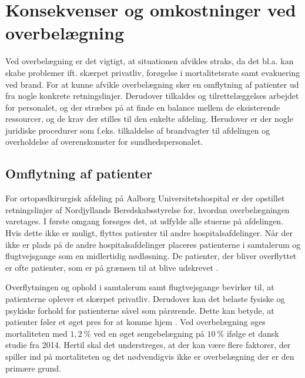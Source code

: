 \section{Konsekvenser og omkostninger ved overbelægning}
Ved overbelægning er det vigtigt, at situationen afvikles straks, da det bl.a. kan skabe problemer ift. skærpet privatliv, forøgelse i mortalitetsrate samt evakuering ved brand. \cite{Madsen2014} For at kunne afvikle overbelægning sker en omflytning af patienter ud fra nogle konkrete retningslinjer. \cite{Beredskab2016} Derudover tilkaldes og tilrettelæggelses arbejdet for personalet, og der stræbes på at finde en balance mellem de eksisterende ressourcer, og de krav der stilles til den enkelte afdeling. \cite{Bjerg2016} Herudover er der nogle juridiske procedurer som f.eks. tilkaldelse af brandvagter til afdelingen og overholdelse af overenskomster for sundhedspersonalet. \cite{Beredskab2016}


\subsection{Omflytning af patienter}
For ortopædkirurgisk afdeling på Aalborg Universitetshospital er der opstillet retningslinjer af Nordjyllands Beredskabsstyrelse for, hvordan overbelægningen varetages. I første omgang forsøges det, at udfylde alle stuerne på afdelingen. Hvis dette ikke er muligt, flyttes patienter til andre hospitalsafdelinger. Når der ikke er plads på de andre hospitalsafdelinger placeres patienterne i samtalerum og flugtvejsgange som en midlertidig nødløsning. \cite{Beredskab2016} De patienter, der bliver overflyttet er ofte patienter, som er på grænsen til at blive udskrevet .


\noindet
Overflytningen og ophold i samtalerum samt flugtvejsgange bevirker til, at patienterne oplever et skærpet privatliv. \cite{Madsen2014} Derudover kan det belaste fysiske og psykiske forhold for patienterne såvel som pårørende. \cite{Heidmann2014} Dette kan betyde, at patienter føler et øget pres for at komme hjem . Ved overbelægning øges mortaliteten med $1,2~\%$ ved en øget sengebelægning på $10~\%$ ifølge et dansk studie fra 2014. \cite{Madsen2014} Hertil skal det understreges, at der kan være flere faktorer, der spiller ind på mortaliteten og det nødvendigvis ikke er overbelægning der er den primære grund. 


